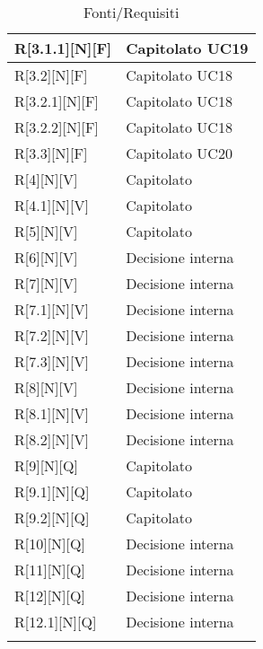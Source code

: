 \begin{longtable}{X | X}
\hline
R[3.1.1][N][F] & Capitolato \newline UC19 \\
\hline
R[3.2][N][F] & Capitolato \newline UC18 \\
\hline
R[3.2.1][N][F] & Capitolato \newline UC18 \\
\hline
R[3.2.2][N][F] & Capitolato \newline UC18 \\
\hline
R[3.3][N][F] & Capitolato \newline UC20 \\
\hline
R[4][N][V] & Capitolato \\
\hline
R[4.1][N][V] & Capitolato \\
\hline
R[5][N][V] & Capitolato \\
\hline
R[6][N][V] & Decisione interna \\
\hline
R[7][N][V] & Decisione interna \\
\hline
R[7.1][N][V] & Decisione interna \\
\hline
R[7.2][N][V] & Decisione interna \\
\hline
R[7.3][N][V] & Decisione interna \\
\hline
R[8][N][V] & Decisione interna \\
\hline
R[8.1][N][V] & Decisione interna \\
\hline
R[8.2][N][V] & Decisione interna \\
\hline
R[9][N][Q] & Capitolato \\
\hline
R[9.1][N][Q] & Capitolato \\
\hline
R[9.2][N][Q] & Capitolato \\
\hline
R[10][N][Q] & Decisione interna \\
\hline
R[11][N][Q] & Decisione interna \\
\hline
R[12][N][Q] & Decisione interna \\
\hline 
R[12.1][N][Q] & Decisione interna \\
\bottomrule
\caption{Fonti/Requisiti}
\end{longtable}   